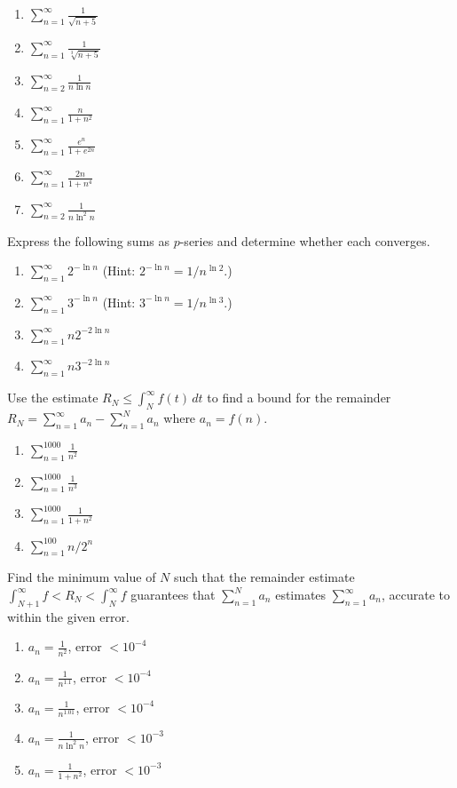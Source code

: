 \documentclass{exercises}
\begin{document}
\begin{enumerate}[resume]
\item $\sum_{n=1}^{\infty}\frac{1}{\sqrt{n+5}}$
\item $\sum_{n=1}^{\infty}\frac{1}{\sqrt[3]{n+5}}$
\item $\sum_{n=2}^{\infty}\frac{1}{n\ln n}$
\item $\sum_{n=1}^{\infty}\frac{n}{1+n^{2}}$
\item $\sum_{n=1}^{\infty}\frac{e^{n}}{1+e^{2n}}$
\item $\sum_{n=1}^{\infty}\frac{2n}{1+n^{4}}$
\item $\sum_{n=2}^{\infty}\frac{1}{n\ln^{2}n}$
\end{enumerate}

Express the following sums as $p$-series and determine whether each converges.

\begin{enumerate}[resume]
\item $\sum_{n=1}^{\infty}2^{-\ln n}$ (Hint: $2^{-\ln n}=1/n^{\ln 2}$.)
\item $\sum_{n=1}^{\infty}3^{-\ln n}$ (Hint: $3^{-\ln n}=1/n^{\ln 3}$.)
\item $\sum_{n=1}^{\infty}n2^{-2\ln n}$
\item $\sum_{n=1}^{\infty}n3^{-2\ln n}$
\end{enumerate}

Use the estimate $R_{N}\le \int_{N}^{\infty}f(t)\,dt$ to find a bound for the remainder $R_{N}=\sum_{n=1}^{\infty}a_{n}-\sum_{n=1}^{N}a_{n}$ where $a_{n}=f(n)$.

\begin{enumerate}[resume]
\item $\sum_{n=1}^{1000}\frac{1}{n^{2}}$
\item $\sum_{n=1}^{1000}\frac{1}{n^{3}}$
\item $\sum_{n=1}^{1000}\frac{1}{1+n^{2}}$
\item $\sum_{n=1}^{100}n/2^{n}$
\end{enumerate}

\techrequired Find the minimum value of $N$ such that the remainder estimate $\int_{N+1}^{\infty}f<R_{N}<\int_{N}^{\infty}f$ guarantees that $\sum_{n=1}^{N}a_{n}$ estimates $\sum_{n=1}^{\infty}a_{n}$, accurate to within the given error.

\begin{enumerate}[resume]
\item $a_{n}=\frac{1}{n^{2}}$, error $<10^{-4}$
\item $a_{n}=\frac{1}{n^{1.1}}$, error $<10^{-4}$
\item $a_{n}=\frac{1}{n^{1.01}}$, error $<10^{-4}$
\item $a_{n}=\frac{1}{n\ln^{2}n}$, error $<10^{-3}$
\item $a_{n}=\frac{1}{1+n^{2}}$, error $<10^{-3}$
\end{enumerate}
\end{document}
